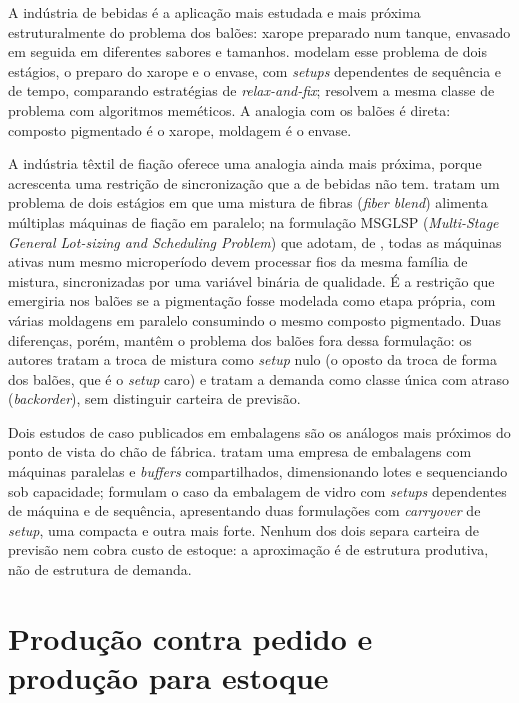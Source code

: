 \documentclass[
    12pt,
    openright,
    oneside,
    a4paper,
    fleqn,
    chapter=TITLE,
    section=TITLE,
    english,
    brazil
]{abntex2}
\begin{document}
A indústria de bebidas é a aplicação mais estudada e mais próxima estruturalmente do problema dos balões: xarope preparado num tanque, envasado em seguida em diferentes sabores e tamanhos.  modelam esse problema de dois estágios, o preparo do xarope e o envase, com \textit{setups} dependentes de sequência e de tempo, comparando estratégias de \textit{relax-and-fix};  resolvem a mesma classe de problema com algoritmos meméticos. A analogia com os balões é direta: composto pigmentado é o xarope, moldagem é o envase.

A indústria têxtil de fiação oferece uma analogia ainda mais próxima, porque acrescenta uma restrição de sincronização que a de bebidas não tem.  tratam um problema de dois estágios em que uma mistura de fibras (\textit{fiber blend}) alimenta múltiplas máquinas de fiação em paralelo; na formulação MSGLSP (\textit{Multi-Stage General Lot-sizing and Scheduling Problem}) que adotam, de , todas as máquinas ativas num mesmo microperíodo devem processar fios da mesma família de mistura, sincronizadas por uma variável binária de qualidade. É a restrição que emergiria nos balões se a pigmentação fosse modelada como etapa própria, com várias moldagens em paralelo consumindo o mesmo composto pigmentado. Duas diferenças, porém, mantêm o problema dos balões fora dessa formulação: os autores tratam a troca de mistura como \textit{setup} nulo (o oposto da troca de forma dos balões, que é o \textit{setup} caro) e tratam a demanda como classe única com atraso (\textit{backorder}), sem distinguir carteira de previsão.

Dois estudos de caso publicados em embalagens são os análogos mais próximos do ponto de vista do chão de fábrica.  tratam uma empresa de embalagens com máquinas paralelas e \textit{buffers} compartilhados, dimensionando lotes e sequenciando sob capacidade;  formulam o caso da embalagem de vidro com \textit{setups} dependentes de máquina e de sequência, apresentando duas formulações com \textit{carryover} de \textit{setup}, uma compacta e outra mais forte. Nenhum dos dois separa carteira de previsão nem cobra custo de estoque: a aproximação é de estrutura produtiva, não de estrutura de demanda.

\section{Produção contra pedido e produção para estoque}
\label{sec:mto_mts}
\end{document}

